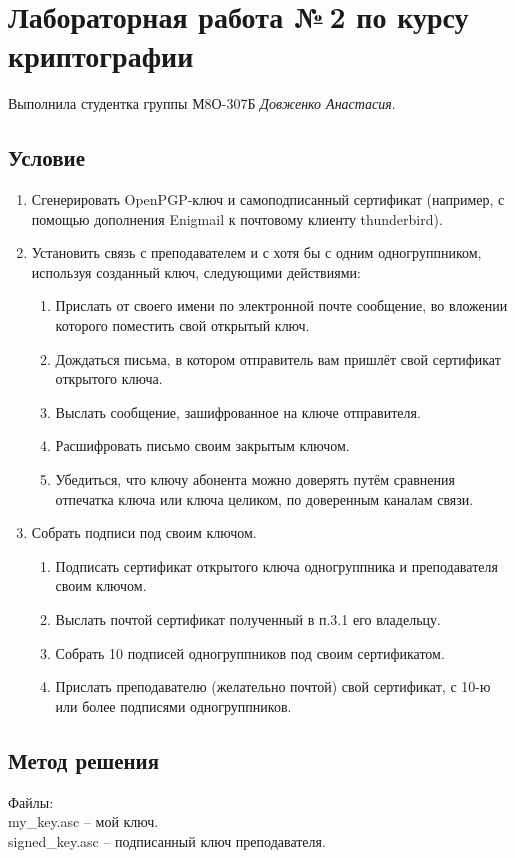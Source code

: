 \documentclass[12pt]{article}
\begin{document}
\section*{Лабораторная работа №\,2 по курсу криптографии}

Выполнила студентка группы М8О-307Б \textit{Довженко Анастасия}.

\subsection*{Условие}

\begin{enumerate} 
\item Сгенерировать OpenPGP-ключ и самоподписанный сертификат (например, с помощью дополнения Enigmail к почтовому клиенту thunderbird).
\item Установить связь с преподавателем и с хотя бы с одним одногруппником, используя созданный ключ, следующими действиями:
\begin{enumerate} 
\item Прислать от своего имени по электронной почте сообщение, во вложении которого поместить свой открытый ключ.
\item Дождаться письма, в котором отправитель вам пришлёт свой сертификат открытого ключа.
\item Выслать сообщение, зашифрованное на ключе отправителя.
\item Расшифровать письмо своим закрытым ключом.
\item Убедиться, что ключу абонента можно доверять путём сравнения отпечатка ключа или ключа целиком, по доверенным каналам связи.
\end{enumerate} 
\item Собрать подписи под своим ключом.
\begin{enumerate}
\item Подписать сертификат открытого ключа одногруппника и преподавателя своим ключом.
\item Выслать почтой сертификат полученный в п.3.1 его владельцу.
\item Собрать 10 подписей одногруппников под своим сертификатом.
\item Прислать преподавателю (желательно почтой) свой сертификат, с 10-ю или более подписями одногруппников.
\end{enumerate}
\end{enumerate}


\subsection*{Метод решения}
Файлы:\\
my\_key.asc -- мой ключ.\\
signed\_key.asc -- подписанный ключ преподавателя.\\
\newpage
\end{document}
